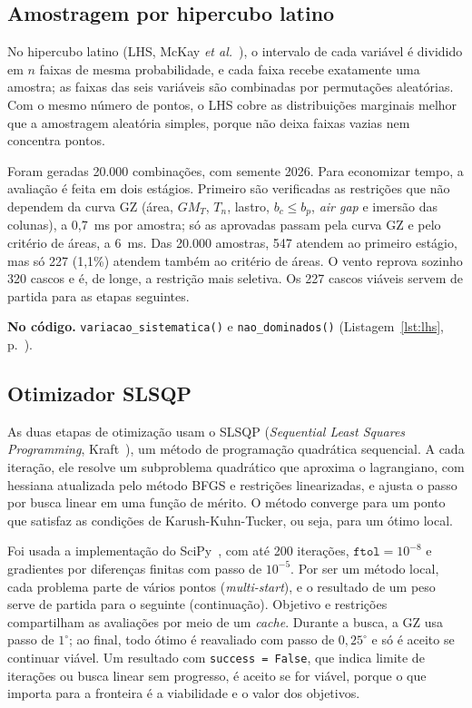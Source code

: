 \documentclass[11pt,a4paper]{article}
\newcommand{\notacodigo}[1]{\begin{nocodigo}\textbf{\sffamily\color{azul}No código.} #1\end{nocodigo}}
\newcommand{\lst}[1]{Listagem~\ref{lst:#1}, p.~\pageref{lst:#1}}
\begin{document}
\subsection{Amostragem por hipercubo latino}

No hipercubo latino (LHS, McKay \emph{et al.}~\cite{mckay}), o intervalo de cada variável é
dividido em $n$ faixas de mesma probabilidade, e cada faixa recebe exatamente uma amostra; as faixas
das seis variáveis são combinadas por permutações aleatórias. Com o mesmo número de pontos, o LHS
cobre as distribuições marginais melhor que a amostragem aleatória simples, porque não deixa faixas
vazias nem concentra pontos.

Foram geradas 20.000 combinações, com semente 2026. Para economizar tempo, a avaliação é feita em
dois estágios. Primeiro são verificadas as restrições que não dependem da curva GZ (área, $GM_T$,
$T_n$, lastro, $b_c \le b_p$, \emph{air gap} e imersão das colunas), a 0,7~ms por amostra; só as
aprovadas passam pela curva GZ e pelo critério de áreas, a 6~ms. Das 20.000 amostras, 547
atendem ao primeiro estágio, mas só 227 (1,1\%) atendem também ao critério de áreas. O vento
reprova sozinho 320 cascos e é, de longe, a restrição mais seletiva. Os 227 cascos viáveis servem
de partida para as etapas seguintes.

\notacodigo{\texttt{variacao\_sistematica()} e \texttt{nao\_dominados()} (\lst{lhs}).}

\subsection{Otimizador SLSQP}

As duas etapas de otimização usam o SLSQP (\emph{Sequential Least Squares Programming},
Kraft~\cite{kraft}), um método de programação quadrática sequencial. A cada iteração, ele resolve um
subproblema quadrático que aproxima o lagrangiano, com hessiana atualizada pelo método BFGS e
restrições linearizadas, e ajusta o passo por busca linear em uma função de mérito. O método
converge para um ponto que satisfaz as condições de Karush-Kuhn-Tucker, ou seja, para um ótimo
local.

Foi usada a implementação do SciPy~\cite{scipy}, com até 200 iterações, $\texttt{ftol} = 10^{-8}$
e gradientes por diferenças finitas com passo de $10^{-5}$. Por ser um método local, cada problema
parte de vários pontos (\emph{multi-start}), e o resultado de um peso serve de partida para o
seguinte (continuação). Objetivo e restrições compartilham as avaliações por meio de um
\emph{cache}. Durante a busca, a GZ usa passo de $1^\circ$; ao final, todo ótimo é reavaliado com
passo de $0{,}25^\circ$ e só é aceito se continuar viável. Um resultado com
\texttt{success = False}, que indica limite de iterações ou busca linear sem progresso, é aceito
se for viável, porque o que importa para a fronteira é a viabilidade e o valor dos objetivos.
\end{document}

